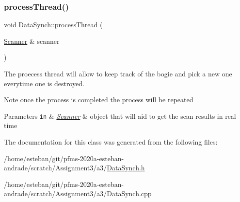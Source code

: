 \subsubsection{\texorpdfstring{process\+Thread()}{processThread()}}
{\footnotesize\ttfamily void Data\+Synch\+::process\+Thread (\begin{DoxyParamCaption}\item[{\hyperlink{classScanner}{Scanner} \&}]{scanner }\end{DoxyParamCaption})}



The proecess thread will allow to keep track of the bogie and pick a new one everytime one is destroyed. 

\begin{DoxyNote}{Note}
once the process is completed the process will be repeated 
\end{DoxyNote}

\begin{DoxyParams}[1]{Parameters}
\mbox{\tt in}  & {\em \hyperlink{classScanner}{Scanner}} & object that will aid to get the scan results in real time \\
\hline
\end{DoxyParams}


The documentation for this class was generated from the following files\+:\begin{DoxyCompactItemize}
\item 
/home/esteban/git/pfms-\/2020a-\/esteban-\/andrade/scratch/\+Assignment3/a3/\hyperlink{DataSynch_8h}{Data\+Synch.\+h}\item 
/home/esteban/git/pfms-\/2020a-\/esteban-\/andrade/scratch/\+Assignment3/a3/Data\+Synch.\+cpp\end{DoxyCompactItemize}
